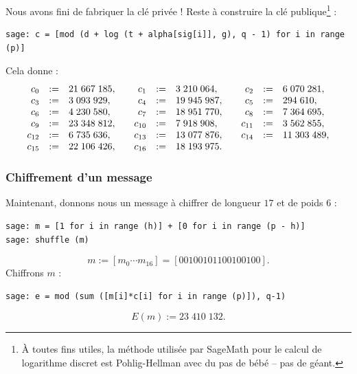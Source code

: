 \documentclass[a4paper, titlepage, 11pt]{article}
\theoremstyle{definition}
\theoremstyle{remark}
\begin{document}
Nous avons fini de fabriquer la clé privée ! Reste à construire la clé publique\footnote{À toutes fins utiles, la méthode utilisée par SageMath pour le calcul de logarithme discret est Pohlig-Hellman avec du pas de bébé -- pas de géant.} :
\begin{verbatim}
sage: c = [mod (d + log (t + alpha[sig[i]], g), q - 1) for i in range (p)]
\end{verbatim}
Cela donne :
$$\begin{array}{r c l c r c l c r c l}
c_0 &:=& 21\;667\;185, &&
c_1 &:=& 3\;210\;064, &&
c_2 &:=& 6\;070\;281, \\
c_3 &:=& 3\;093\;929, &&
c_4 &:=& 19\;945\;987, &&
c_5 &:=& 294\;610, \\
c_6 &:=& 4\;230\;580, &&
c_7 &:=& 18\;951\;770, &&
c_8 &:=& 7\;364\;695, \\
c_9 &:=& 23\;348\;812, &&
c_{10} &:=& 7\;918\;908, &&
c_{11} &:=& 3\;562\;855, \\
c_{12} &:=& 6\;735\;636, &&
c_{13} &:=& 13\;077\;876, &&
c_{14} &:=& 11\;303\;489, \\
c_{15} &:=& 22\;106\;426, &&
c_{16} &:=& 18\;193\;975.
\end{array}$$


\subsubsection{Chiffrement d'un message}
Maintenant, donnons nous un message à chiffrer de longueur $17$ et de poids $6$ :
\begin{verbatim}
sage: m = [1 for i in range (h)] + [0 for i in range (p - h)]
sage: shuffle (m)
\end{verbatim}
$$m := [m_0\cdots m_{16}] = [00100101100100100].$$
Chiffrons $m$ :
\begin{verbatim}
sage: e = mod (sum ([m[i]*c[i] for i in range (p)]), q-1)
\end{verbatim}
$$E(m) := 23\;410\;132.$$
\end{document}

